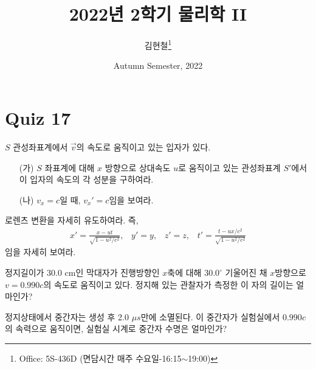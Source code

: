 \documentclass[tightenlines,floatfix,nofootinbib,superscriptaddress,fleqn]{revtex4}
\begin{document}
\title{\Large 2022년 2학기 물리학 II}
\author{김현철\footnote{Office: 5S-436D (면담시간 매주
    수요일-16:15$\sim$19:00)}} 
\date{Autumn Semester, 2022}

\maketitle

\section*{\large Quiz 17}
$S$ 관성좌표계에서 $\vec{v}$의 속도로 움직이고 있는 입자가 있다.
\begin{itemize}
\item[(가)]  $S$ 좌표계에 대해 $x$ 방향으로 상대속도 $u$로 움직이고
  있는 관성좌표계 $S'$에서 이 입자의 속도의 각 성분을 구하여라. 
\item[(나)] $v_x=c$일 때, $v_x'=c$임을 보여라. 
\end{itemize}
\newpage

로렌츠 변환을 자세히 유도하여라. 즉,
\begin{align}
  \label{eq:1}
  x' = \frac{x-ut}{\sqrt{1-u^2/c^2}},\;\;\; y'=y,\;\;\;z'=z,\;\;\;
  t' = \frac{t-ux/c^2}{\sqrt{1-u^2/c^2}}
\end{align}
임을 자세히 보여라. 
\newpage

정지길이가 30.0 cm인 막대자가 진행방향인 $x$축에 대해 $30.0^\circ$
기울어진 채 $x$방향으로 $v=0.990c$의 속도로 움직이고 있다. 정지해 있는
관찰자가 측정한 이 자의 길이는 얼마인가? 

\newpage

정지상태에서 중간자는 생성 후 2.0 $\mu s$만에 소멸된다. 이 중간자가
실험실에서 $0.990c$의 속력으로 움직이면, 실험실 시계로 중간자 수명은
얼마인가? 
\end{document}

